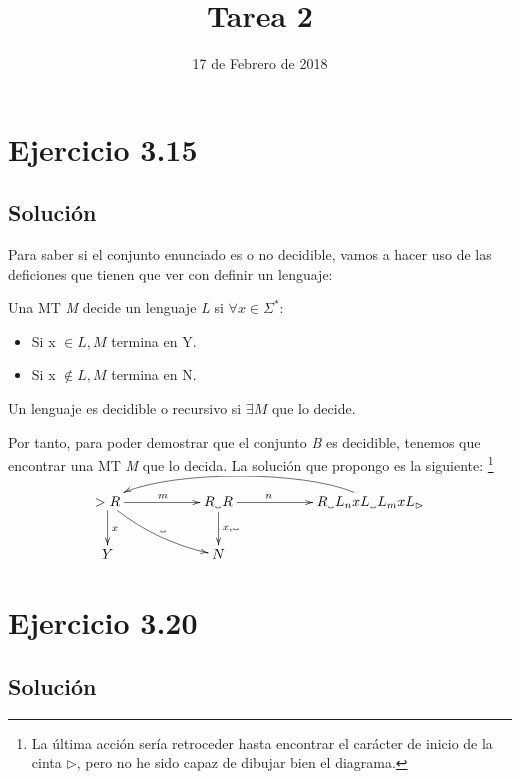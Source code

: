 \documentclass[11pt, a4paper, titlepage]{article}
\newcommand\vartextvisiblespace[1][.5em]{%
  \makebox[#1]{%
    \kern.07em
    \vrule height.3ex
    \hrulefill
    \vrule height.3ex
    \kern.07em
  }%
}
\begin{document}
\title{Tarea 2}
\date{17 de Febrero de 2018}
\maketitle
\newpage



\section*{Ejercicio 3.15}
\subsection*{Solución}


Para saber si el conjunto enunciado es o no decidible, vamos a hacer uso de las
deficiones que tienen que ver con definir un lenguaje:

Una MT \textit{M} decide un lenguaje \textit{L} si $\forall x \in \Sigma^*:$
\begin{itemize}
  \item Si x $\in \textit{L}, \textit{M}$ termina en Y.
  \item Si x $\notin \textit{L}, \textit{M}$ termina en N.
\end{itemize}

Un lenguaje es decidible o recursivo si $\exists \textit{M}$ que lo decide.


Por tanto, para poder demostrar que el conjunto \textit{B} es decidible, tenemos
que encontrar una MT \textit{M} que lo decida. La solución que propongo es la
siguiente: \footnote{La última acción sería retroceder hasta encontrar el
carácter de inicio de la cinta $\rhd$, pero no he sido capaz de dibujar bien el
diagrama.}

\[
\xymatrix{
  >R \ar[rr]^{m} \ar[d]^{x} \ar@/_/[rrd]^{\vartextvisiblespace} & & R_{\vartextvisiblespace}R \ar[d]^{x,\vartextvisiblespace} \ar[rr]^(.33){n} && R_{\vartextvisiblespace}L_{n}xL_{\vartextvisiblespace}L_{m}xL_{\rhd} \ar@(ul,ur)[llll] \\
  Y &&N
}
\]

\section*{Ejercicio 3.20}
\subsection*{Solución}
\end{document}
